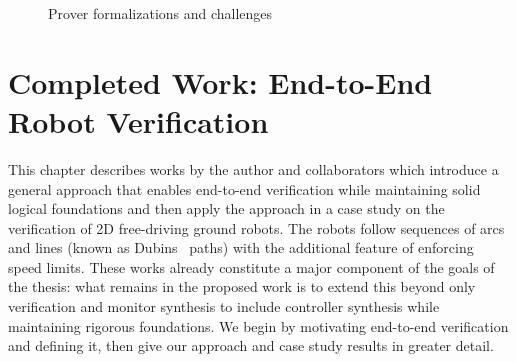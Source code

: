 \documentclass[12pt]{cmuthesis}
\theoremstyle{definition}
\theoremstyle{remark}
\begin{document}
  \begin{figure}
    \centering
\caption{Prover formalizations and challenges}
\label{fig:prover-formalizations}
  \end{figure}

\chapter{Completed Work:  End-to-End Robot Verification}
\label{ch:end-to-end-v}
This chapter describes  works by the author and collaborators which introduce a general approach that enables end-to-end verification while maintaining solid logical foundations and then apply the approach in a case study on the verification of 2D free-driving ground robots.
The robots follow sequences of arcs and lines (known as Dubins~\cite{citeulike:12223454} paths) with the additional feature of enforcing speed limits.
These works already constitute a major component of the goals of the thesis: what remains in the proposed work is to extend this beyond only verification and monitor synthesis to include controller synthesis while maintaining rigorous foundations.
We begin by motivating end-to-end verification and defining it, then give our approach and case study results in greater detail.
\end{document}
